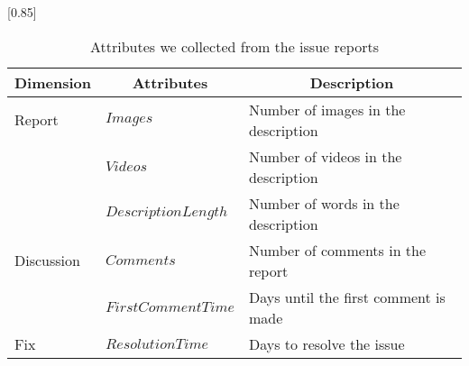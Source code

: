 
\begin{table}[t]
    \begin{center}
    \caption{Attributes we collected from the issue reports}
    \scalebox{0.85}[0.85]{
    \begin{tabular}{llp{4.6cm}} 
        \toprule
        \multicolumn{1}{c}{\textbf{Dimension}}&\multicolumn{1}{c}{\textbf{Attributes}} & \multicolumn{1}{c}{\textbf{Description}} \\ 
        \midrule
        Report&$Images$ & Number of images in the description \\
        &$Videos$ & Number of videos in the description \\
        &$DescriptionLength$ & Number of words in the description\\
        \hline
        Discussion&$Comments$ & Number of comments in the report\\
        &$FirstCommentTime$ & Days until the first comment is made \\
        
        \hline
        Fix&$ResolutionTime$ & Days to resolve the issue \\

        \bottomrule
    \end{tabular}
    }
    \label{tab:issue-attr}
    \end{center}
\end{table}
